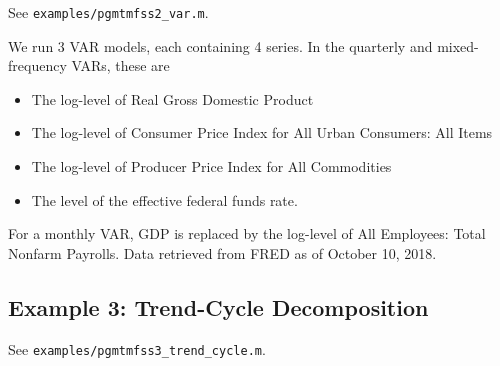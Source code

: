 \documentclass{article}
\begin{document}
See \texttt{examples/pgmtmfss2\_var.m}. 

We run 3 VAR models, each containing 4 series. In the quarterly and mixed-frequency VARs, these are
\begin{itemize}
  \item The log-level of Real Gross Domestic Product
  \item The log-level of Consumer Price Index for All Urban Consumers: All Items
  \item The log-level of Producer Price Index for All Commodities
  \item The level of the effective federal funds rate.
\end{itemize}
For a monthly VAR, GDP is replaced by the log-level of All Employees: Total Nonfarm Payrolls. Data retrieved from FRED as of October 10, 2018. 

\subsection{Example 3: Trend-Cycle Decomposition}

See \texttt{examples/pgmtmfss3\_trend\_cycle.m}. 
\end{document}

